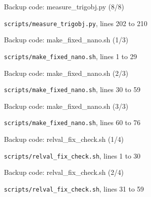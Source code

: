 \begin{frame}{Backup code: measure\_trigobj.py (8/8)}
  \vspace{0pt}\par
  {\tiny\color{lightgrey}\texttt{scripts/measure\_trigobj.py}, lines 202 to 210\par}
  
\end{frame}
\begin{frame}{Backup code: make\_fixed\_nano.sh (1/3)}
  \vspace{0pt}\par
  {\tiny\color{lightgrey}\texttt{scripts/make\_fixed\_nano.sh}, lines 1 to 29\par}
  
\end{frame}
\begin{frame}{Backup code: make\_fixed\_nano.sh (2/3)}
  \vspace{0pt}\par
  {\tiny\color{lightgrey}\texttt{scripts/make\_fixed\_nano.sh}, lines 30 to 59\par}
  
\end{frame}
\begin{frame}{Backup code: make\_fixed\_nano.sh (3/3)}
  \vspace{0pt}\par
  {\tiny\color{lightgrey}\texttt{scripts/make\_fixed\_nano.sh}, lines 60 to 76\par}
  
\end{frame}
\begin{frame}{Backup code: relval\_fix\_check.sh (1/4)}
  \vspace{0pt}\par
  {\tiny\color{lightgrey}\texttt{scripts/relval\_fix\_check.sh}, lines 1 to 30\par}
  
\end{frame}
\begin{frame}{Backup code: relval\_fix\_check.sh (2/4)}
  \vspace{0pt}\par
  {\tiny\color{lightgrey}\texttt{scripts/relval\_fix\_check.sh}, lines 31 to 59\par}
  
\end{frame}
